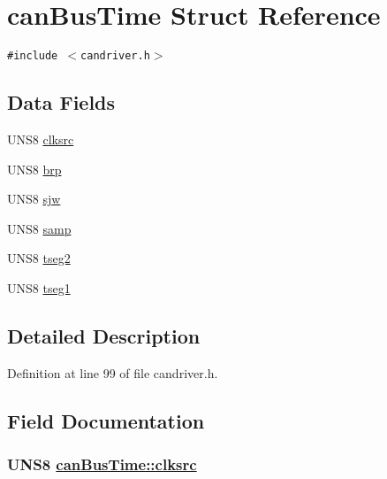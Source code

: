 \hypertarget{structcanBusTime}{
\section{can\-Bus\-Time Struct Reference}
\label{structcanBusTime}
}
{\tt \#include $<$candriver.h$>$}

\subsection*{Data Fields}
\begin{CompactItemize}
\item 
UNS8 \hyperlink{structcanBusTime_04e7cf483b29918f0da5c562400e6071}{clksrc}
\item 
UNS8 \hyperlink{structcanBusTime_f2230f4eeb1d12dd051e7f6369cb1ebb}{brp}
\item 
UNS8 \hyperlink{structcanBusTime_deeefef09ef47dba2df92b45e563368f}{sjw}
\item 
UNS8 \hyperlink{structcanBusTime_a14822cbe84c152c1c79901f0c4fd0f1}{samp}
\item 
UNS8 \hyperlink{structcanBusTime_7bafebcf05024a19e463f29b1c09c390}{tseg2}
\item 
UNS8 \hyperlink{structcanBusTime_3532d6d7cd2b1f3980b82dfce78f0fe9}{tseg1}
\end{CompactItemize}


\subsection{Detailed Description}




Definition at line 99 of file candriver.h.

\subsection{Field Documentation}
\hypertarget{structcanBusTime_04e7cf483b29918f0da5c562400e6071}{
\subsubsection[clksrc]{\setlength{\rightskip}{0pt plus 5cm}UNS8 \hyperlink{structcanBusTime_04e7cf483b29918f0da5c562400e6071}{can\-Bus\-Time::clksrc}}}
\label{structcanBusTime_04e7cf483b29918f0da5c562400e6071}




